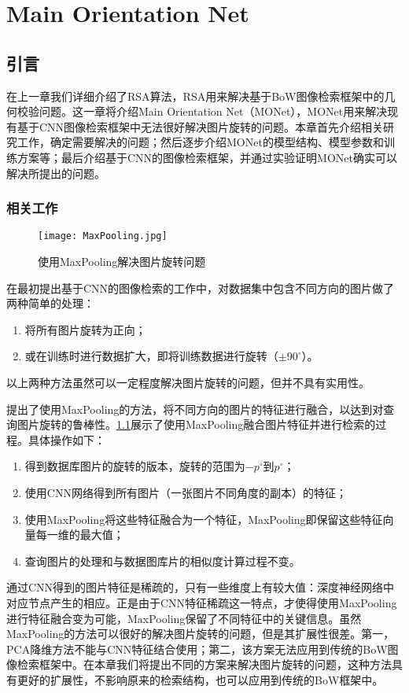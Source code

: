 \chapter{Main Orientation Net}

\section{引言}
在上一章我们详细介绍了RSA算法，RSA用来解决基于BoW图像检索框架中的几何校验问题。这一章将介绍Main Orientation Net（MONet），MONet用来解决现有基于CNN图像检索框架中无法很好解决图片旋转的问题。本章首先介绍相关研究工作，确定需要解决的问题；然后逐步介绍MONet的模型结构、模型参数和训练方案等；最后介绍基于CNN的图像检索框架，并通过实验证明MONet确实可以解决所提出的问题。


\subsection{相关工作}
\begin{figure}
	\centering
	\texttt{[image: MaxPooling.jpg]}
	\caption{使用MaxPooling解决图片旋转问题}\label{fig:maxpooling}
\end{figure}
在最初提出基于CNN的图像检索的工作\cite{babenko2014neural}中，对数据集中包含不同方向的图片做了两种简单的处理：
\begin{enumerate}
	\item 将所有图片旋转为正向；
	\item 或在训练时进行数据扩大，即将训练数据进行旋转（$\pm90^{\circ}$）。
\end{enumerate}
以上两种方法虽然可以一定程度解决图片旋转的问题，但并不具有实用性。

\cite{chandrasekhar2015practical}提出了使用MaxPooling的方法，将不同方向的图片的特征进行融合，以达到对查询图片旋转的鲁棒性。\ref{fig:maxpooling}展示了使用MaxPooling融合图片特征并进行检索的过程。具体操作如下：
\begin{enumerate}
	\item 得到数据库图片的旋转的版本，旋转的范围为$-p^{\circ}$到$p^{\circ}$；
	\item 使用CNN网络得到所有图片（一张图片不同角度的副本）的特征；
	\item 使用MaxPooling将这些特征融合为一个特征，MaxPooling即保留这些特征向量每一维的最大值；
	\item 查询图片的处理和与数据图库片的相似度计算过程不变。
\end{enumerate}

通过CNN得到的图片特征是稀疏的，只有一些维度上有较大值：深度神经网络中对应节点产生的相应。正是由于CNN特征稀疏这一特点，才使得使用MaxPooling进行特征融合变为可能，MaxPooling保留了不同特征中的关键信息。虽然MaxPooling的方法可以很好的解决图片旋转的问题，但是其扩展性很差。第一，PCA降维方法不能与CNN特征结合使用；第二，该方案无法应用到传统的BoW图像检索框架中。在本章我们将提出不同的方案来解决图片旋转的问题，这种方法具有更好的扩展性，不影响原来的检索结构，也可以应用到传统的BoW框架中。

